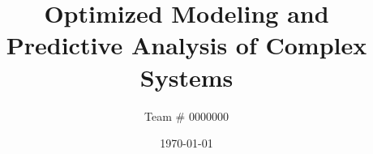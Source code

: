 \documentclass{mcmthesis} %
\title{Optimized Modeling and Predictive Analysis of Complex Systems}
\author{Team \# 0000000}
\date{\today}
\theoremstyle{scplain}
\begin{document}
\begin{abstract}

\end{abstract}

\maketitle
\tableofcontents
\newpage

















\newpage

\end{document}
